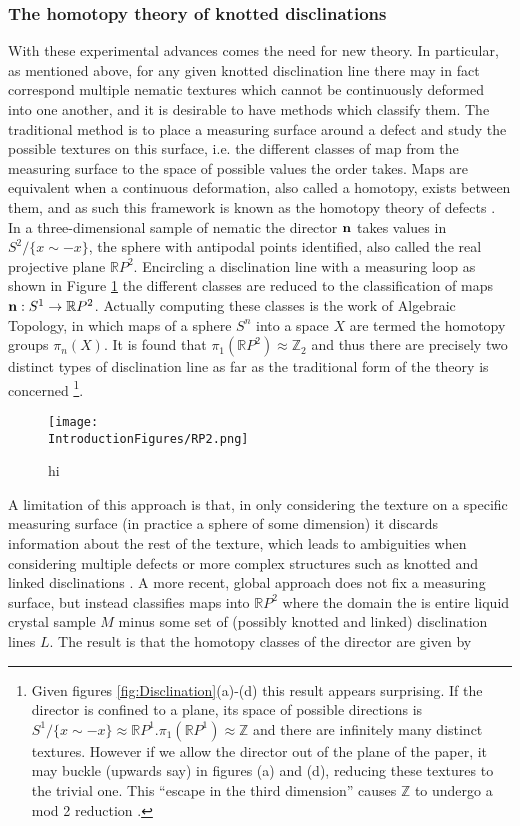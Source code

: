 \subsubsection{The homotopy theory of knotted disclinations}
With these experimental advances comes the need for new theory. In particular, as mentioned above, for any given knotted disclination line there may in fact correspond multiple nematic textures which cannot be continuously deformed into one another, and it is desirable to have methods which classify them. The traditional method is to place a measuring surface around a defect and study the possible textures on this surface, i.e. the different classes of map from the measuring surface to the space of possible values the order takes. Maps are equivalent when a continuous deformation, also called a homotopy, exists between them, and as such this framework is known as the homotopy theory of defects \cite{Mermin,Alexander}. In a three-dimensional sample of nematic the director $\bf n$ takes values in $S^2/\{x\sim-x\}$, the sphere with antipodal points identified, also called the real projective plane $\mathbb{R}P^2$. Encircling a disclination line with a measuring loop as shown in Figure \ref{fig:RP2} the different classes are reduced to the classification of maps ${\bf n}:S^1 \rightarrow \mathbb{R}P^2$. Actually computing these classes is the work of Algebraic Topology, in which maps of a sphere $S^n$ into a space $X$ are termed the homotopy groups $\pi_n(X)$. It is found that $\pi_1(\mathbb{R}P^2) \approx \mathbb{Z}_2$ and thus there are precisely two distinct types of disclination line as far as the traditional form of the theory is concerned \footnote{Given figures \ref{fig:Disclination}(a)-(d) this result appears surprising. If the director is confined to a plane, its space of possible directions is $S^1/\{x\sim-x\} \approx \mathbb{R}P^1$.$\pi_1(\mathbb{R}P^1) \approx \mathbb{Z}$ and there are infinitely many distinct textures. However if we allow the director out of the plane of the paper, it may buckle (upwards say) in figures (a) and (d), reducing these textures to the trivial one. This ``escape in the third dimension'' causes $\mathbb{Z}$ to undergo a mod 2 reduction \cite{Machon}. }.
\begin{figure}[htbp]
\centering
\texttt{[image: \\IntroductionFigures/RP2.png]}
\caption{hi }
\label{fig:RP2}
\end{figure}
A limitation of this approach is that, in only considering the texture on a specific measuring surface (in practice a sphere of some dimension) it discards information about the rest of the texture, which leads to ambiguities when considering multiple defects or more complex structures such as knotted and linked disclinations \cite{Alexander,Machon}. A more recent, global approach \cite{Machon} does not fix a measuring surface, but instead classifies maps into $\mathbb{R}P^2$ where the domain the is entire liquid crystal sample $M$ minus some set of (possibly knotted and linked) disclination lines $L$. The result is that the homotopy classes of the director are given by
